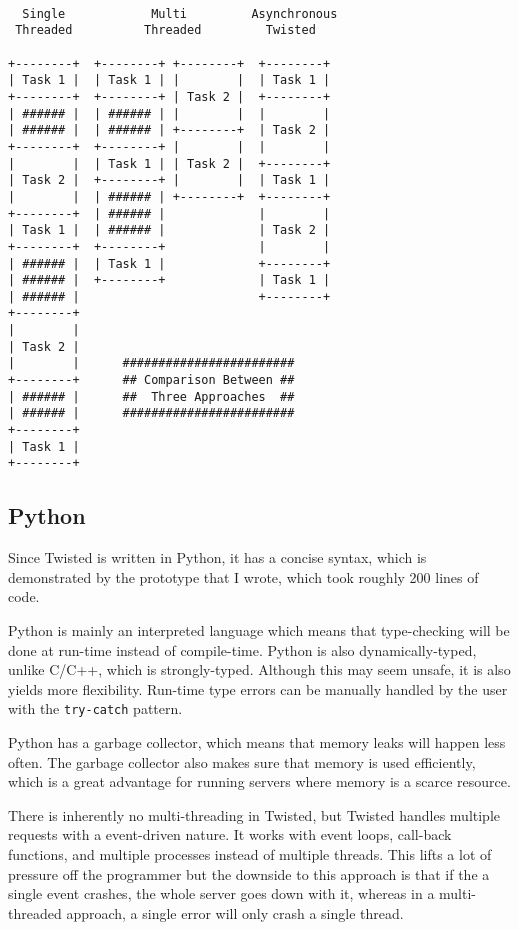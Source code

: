 \documentclass[letterpaper,twocolumn,10pt]{article}
\begin{document}
{\tt \small
\begin{verbatim}
  Single            Multi         Asynchronous
 Threaded          Threaded         Twisted

+--------+  +--------+ +--------+  +--------+
| Task 1 |  | Task 1 | |        |  | Task 1 |
+--------+  +--------+ | Task 2 |  +--------+
| ###### |  | ###### | |        |  |        |
| ###### |  | ###### | +--------+  | Task 2 |
+--------+  +--------+ |        |  |        |
|        |  | Task 1 | | Task 2 |  +--------+
| Task 2 |  +--------+ |        |  | Task 1 |
|        |  | ###### | +--------+  +--------+
+--------+  | ###### |             |        |
| Task 1 |  | ###### |             | Task 2 |
+--------+  +--------+             |        |
| ###### |  | Task 1 |             +--------+
| ###### |  +--------+             | Task 1 |
| ###### |                         +--------+
+--------+
|        |
| Task 2 |
|        |      ########################
+--------+      ## Comparison Between ##
| ###### |      ##  Three Approaches  ##
| ###### |      ########################
+--------+
| Task 1 |
+--------+
\end{verbatim}
}

\subsection{Python}

Since Twisted is written in Python, it has a concise syntax, which is demonstrated by the prototype that I wrote, which took roughly 200 lines of code.

Python is mainly an interpreted language which means that type-checking will be done at run-time instead of compile-time. Python is also dynamically-typed, unlike C/C++, which is strongly-typed. Although this may seem unsafe, it is also yields more flexibility. Run-time type errors can be manually handled by the user with the {\tt try-catch} pattern.

Python has a garbage collector, which means that memory leaks will happen less often. The garbage collector also makes sure that memory is used efficiently, which is a great advantage for running servers where memory is a scarce resource.

There is inherently no multi-threading in Twisted, but Twisted handles multiple requests with a event-driven nature. It works with event loops, call-back functions, and multiple processes instead of multiple threads. This lifts a lot of pressure off the programmer but the downside to this approach is that if the a single event crashes, the whole server goes down with it, whereas in a multi-threaded approach, a single error will only crash a single thread.
\end{document}
